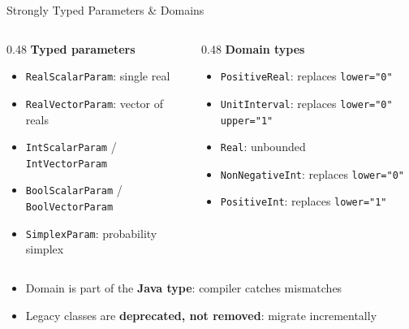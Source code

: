 \documentclass[aspectratio=169,11pt]{beamer}
\newcommand{\code}[1]{\texttt{#1}}
\begin{document}
\begin{frame}{Strongly Typed Parameters \& Domains}
\begin{columns}[T]
\begin{column}{0.48\textwidth}
\textbf{Typed parameters}
\begin{itemize}
\item \code{RealScalarParam}: single real
\item \code{RealVectorParam}: vector of reals
\item \code{IntScalarParam} / \code{IntVectorParam}
\item \code{BoolScalarParam} / \code{BoolVectorParam}
\item \code{SimplexParam}: probability simplex
\end{itemize}
\end{column}
\begin{column}{0.48\textwidth}
\textbf{Domain types}
\begin{itemize}
\item \code{PositiveReal}: replaces \code{lower="0"}
\item \code{UnitInterval}: replaces \code{lower="0" upper="1"}
\item \code{Real}: unbounded
\item \code{NonNegativeInt}: replaces \code{lower="0"}
\item \code{PositiveInt}: replaces \code{lower="1"}
\end{itemize}
\end{column}
\end{columns}

\vspace{1em}
\begin{itemize}
\item Domain is part of the \textbf{Java type}: compiler catches mismatches
\item Legacy classes are \textbf{deprecated, not removed}: migrate incrementally
\end{itemize}
\end{frame}

\end{document}
